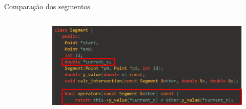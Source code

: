 \documentclass[aspectratio=169,usenames,dvipsnames]{beamer}
\begin{document}
\begin{frame}{Comparação dos segmentos}
  \begin{columns}
      \begin{column}{0.5\textwidth}
      \begin{figure}
          
      \end{figure}
      \end{column}
      \begin{column}{0.5\textwidth}
        \begin{figure}
        \includegraphics[width=\textwidth]{figs/segment.png}
        \end{figure}
      \end{column}
  \end{columns}
\end{frame}
\end{document}
